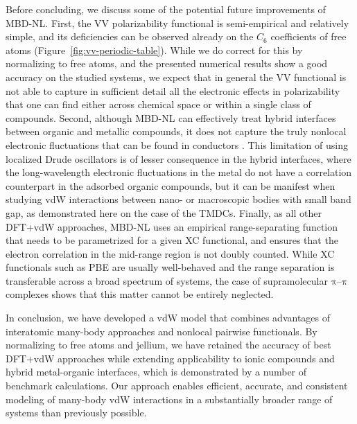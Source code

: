 Before concluding, we discuss some of the potential future improvements of MBD-NL\@.
First, the VV polarizability functional is semi-empirical and relatively simple, and its deficiencies can be observed already on the $C_6$ coefficients of free atoms (Figure~\ref{fig:vv-periodic-table}).
While we do correct for this by normalizing to free atoms, and the presented numerical results show a good accuracy on the studied systems, we expect that in general the VV functional is not able to capture in sufficient detail all the electronic effects in polarizability that one can find either across chemical space or within a single class of compounds.
Second, although MBD-NL can effectively treat hybrid interfaces between organic and metallic compounds, it does not capture the truly nonlocal electronic fluctuations that can be found in conductors \citep{DobsonIJQC14}.
This limitation of using localized Drude oscillators is of lesser consequence in the hybrid interfaces, where the long-wavelength electronic fluctuations in the metal do not have a correlation counterpart in the adsorbed organic compounds, but it can be manifest when studying vdW interactions between nano- or macroscopic bodies with small band gap, as demonstrated here on the case of the TMDCs.
Finally, as all other DFT+vdW approaches, MBD-NL uses an empirical range-separating function that needs to be parametrized for a given XC functional, and ensures that the electron correlation in the mid-range region is not doubly counted.
While XC functionals such as PBE are usually well-behaved and the range separation is transferable across a broad spectrum of systems, the case of supramolecular $\mathrm\pi$--$\mathrm\pi$ complexes shows that this matter cannot be entirely neglected.


In conclusion, we have developed a vdW model that combines advantages of interatomic many-body approaches and nonlocal pairwise functionals.
By normalizing to free atoms and jellium, we have retained the accuracy of best DFT+vdW approaches while extending applicability to ionic compounds and hybrid metal-organic interfaces, which is demonstrated by a number of benchmark calculations.
Our approach enables efficient, accurate, and consistent modeling of many-body vdW interactions in a substantially broader range of systems than previously possible.

